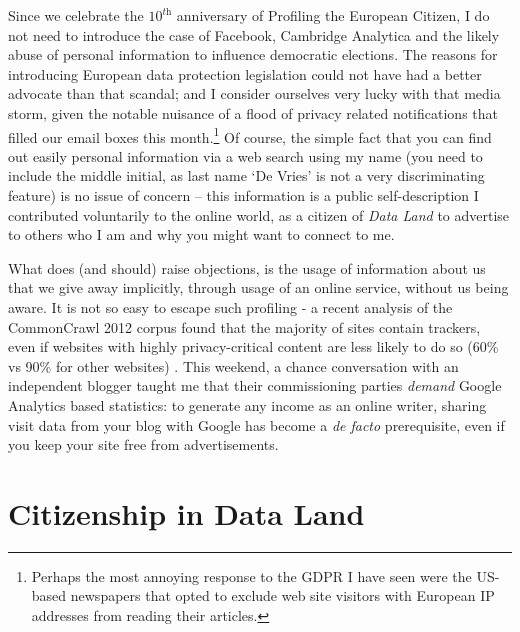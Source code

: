 \documentclass[a4paper,twoside,12pt]{article}
\begin{document}
Since we celebrate the $10^\textit{th}$ anniversary of Profiling the European Citizen, I do not need to introduce the case of Facebook, Cambridge Analytica and the likely abuse of personal information to influence democratic elections. The reasons for introducing European data protection legislation could not have had a better advocate than that scandal; and I consider ourselves very lucky with that media storm, given the notable nuisance of a flood of privacy related notifications that filled our email boxes this month.\footnote{%
Perhaps the most annoying response to the GDPR I have seen were the US-based newspapers that opted to exclude web site visitors with European IP addresses from reading their articles.}
Of course, the simple fact that you can find out easily personal information via a web search using my name (you need to include the middle initial, as last name `De Vries' is not a very discriminating feature) is no issue of concern -- this information is a public self-description I contributed voluntarily to the online world, as a citizen of \emph{Data Land} to advertise to others who I am and why you might want to connect to me. 

What does (and should) raise objections, is the usage of information about us that we give away implicitly, through usage of an online service, without us being aware. It is not so easy to escape such profiling - a recent analysis of the CommonCrawl 2012 corpus found that the majority of sites contain trackers, even if websites with highly privacy-critical content are less likely to do so (60\% vs 90\% for other websites) \cite{schelter18}. This weekend, a chance conversation with an independent blogger taught me that their commissioning parties \emph{demand} Google Analytics based statistics: to generate any income as an online writer, sharing visit data from your blog with Google has become a \emph{de facto} prerequisite, even if you keep your site free from advertisements. 

\section*{Citizenship in Data Land}
\end{document}
